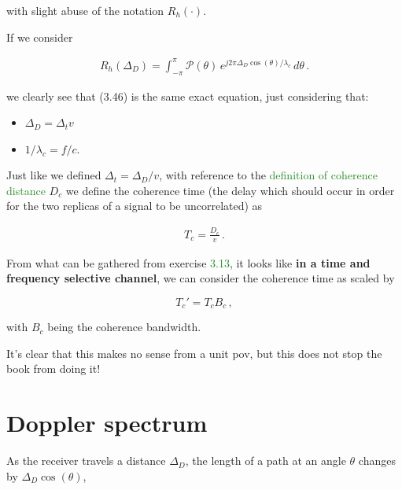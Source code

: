 \documentclass[a4paper, 12pt]{book}
\begin{document}
with slight abuse of the notation $R_h(\cdot)$.

\begin{purplebox}
If we consider

\begin{align}
R_h(\Delta_D) = \int_{-\pi}^{\pi} \mathcal{P}(\theta) \, e^{j 2\pi \Delta_D \cos(\theta)/\lambda_c} \, d\theta \,. \tag{3.42}
\end{align}

we clearly see that (3.46) is the same exact equation, just considering that:
\begin{itemize}
    \item $\Delta_D = \Delta_t v$
    \item $1/\lambda_c = f/c$.
\end{itemize}
\end{purplebox}

\begin{bluebox}
Just like we defined $\Delta_t = \Delta_D / v$, with reference to the \textcolor{ForestGreen}{definition of coherence distance} $D_c$ we define the coherence time (the delay which should occur in order for the two replicas of a signal to be uncorrelated) as

\begin{align}
T_c = \frac{D_c}{v} \,. \tag{3.47+}
\end{align}
\end{bluebox}

From what can be gathered from exercise \textcolor{ForestGreen}{3.13}, it looks like \textbf{in a time and frequency selective channel}, we can consider the coherence time as scaled by

\[
T_c' = T_c B_c \,,
\]

with $B_c$ being the coherence bandwidth.


\begin{greenbar}
It's clear that this makes no sense from a unit pov, but this does not stop the book from doing it!
\end{greenbar}

\section{Doppler spectrum}

As the receiver travels a distance $\Delta_D$, the length of a path at an angle $\theta$ changes by $\Delta_D \cos(\theta)$,
\end{document}
